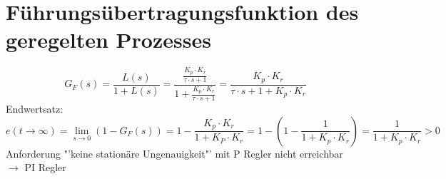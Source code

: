 \section{Führungsübertragungsfunktion des geregelten Prozesses}
\[ G_F(s) = \frac{L(s)}{1 + L(s)} 
    = \frac{\frac{K_p \cdot K_r}{\tau \cdot s + 1}}{1 + \frac{K_p \cdot K_r}{\tau \cdot s + 1}}
    = \frac{K_p \cdot K_r}{\tau \cdot s + 1 + K_p \cdot K_r}
\]
Endwertsatz: 
\[ e(t \to \infty) = \lim\limits_{s \to 0} (1 - G_F(s))
    = 1 - \frac{K_p \cdot K_r}{1 + K_P \cdot K_r}
    = 1 - \left(1 - \frac{1}{1 + K_p \cdot K_r}\right)
    = \frac{1}{1 + K_p \cdot K_r} > 0
\]
Anforderung "'keine stationäre Ungenauigkeit"' mit P Regler nicht erreichbar \\
$\rightarrow$ PI Regler
